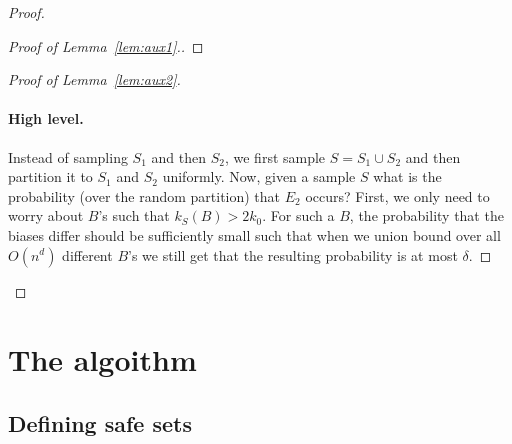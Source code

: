\documentclass{article}
\newcommand{\bias}{\text{bias}}
\newcommand{\samp}{S}
\begin{document}
\begin{proof}
\begin{proof}[Proof of Lemma~\ref{lem:aux1}.]
%

\end{proof}

\begin{proof}[Proof of Lemma~\ref{lem:aux2}]\ \\
\paragraph{High level.}
Instead of sampling $S_1$ and then $S_2$,
we first sample $S=S_1\cup S_2$ and 
then partition it to $S_1$ and $S_2$ uniformly.
Now, given a sample $S$ what is the probability (over the random partition)
that $E_2$ occurs?
First, we only need to worry about $B$'s such that $k_S(B) > 2k_0$.
For such a $B$, the probability that the biases differ should be sufficiently
small such that when we union bound over all $O(n^d)$ different $B$'s
we still get that the resulting probability is at most $\delta$.

\end{proof}

%

\iffalse
Further assume that $\bias(B) = 0.8$,  that $\bias_{\samp_1}(B)=0$, and that $k_1(B)$
is sufficiently large so the $\lvert \bias_{\samp_1}(B) -  \bias(B)\rvert \geq \sqrt{\frac{100d\log n + \log(1/\delta)}{k_1(B)} }$.
Now, since $p(B) \leq 1/1000n$ it follows that $k_2(B)=0$ with probability at least $0.99$.
Now, it is plausible to define $\bias_{\samp_2}(B)=0$ when $k_2(B)=0$,
and therefore we get that $\bias_{\samp_2}=\bias_{\samp_1}=0$ with probability at least $0.99$ and so the event $E_2$ occurs with probability less than $0.01$,
unlike what we wanted.
\fi
\end{proof}

\section{The algoithm}

\subsection{Defining safe sets}
\end{document}
